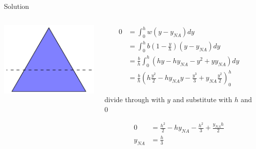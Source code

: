 \documentclass[10pt, svgnames]{beamer}
\begin{document}
\begin{frame}[label={sec:orga4ed3cb}]{Solution}
\begin{columns}
\begin{column}{0.3\columnwidth}
\begin{center}
\includegraphics[width=.9\linewidth]{./pictures/triangular-section-axis.pdf}
\end{center}
\end{column}

\begin{column}{0.6\columnwidth}
\begin{align*}
  0 &= \int_{0}^{h} w(y - y_{NA})dy \\
    &= \int_{0}^{h} b \left( 1- \frac{y}{h} \right)(y - y_{NA})dy \\
    &= \frac{b}{h} \int_{0}^{h} (hy - hy_{NA} - y^{2} + yy_{NA})dy \\
    &= \frac{b}{h} \left( h \frac{y^{2}}{2} - hy_{NA}y - \frac{y^{3}}{3} + y_{NA}\frac{y^{2}}{2} \right)_{0}^{h}
\end{align*}

divide through with \(y\) and substitute with \(h\) and 0

\begin{align*}
  0 &= \frac{h^{2}}{2} - hy_{NA} - \frac{h^{2}}{3} + \frac{y_{NA}h}{2} \\
  y_{NA} &= \frac{h}{3}
\end{align*}
\end{column}
\end{columns}
\end{frame}
\end{document}
